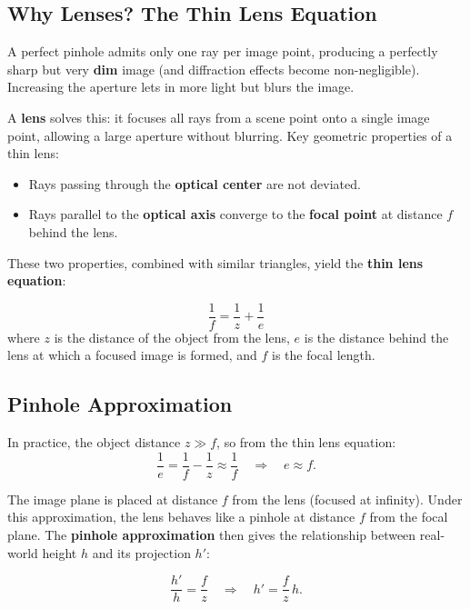\documentclass[11pt,a4paper]{article}
\theoremstyle{definition}
\theoremstyle{plain}
\theoremstyle{remark}
\begin{document}
\subsection{Why Lenses? The Thin Lens Equation}

A perfect pinhole admits only one ray per image point, producing a perfectly sharp but very \textbf{dim} image (and diffraction effects become non-negligible). Increasing the aperture lets in more light but blurs the image.

A \textbf{lens} solves this: it focuses all rays from a scene point onto a single image point, allowing a large aperture without blurring. Key geometric properties of a thin lens:

\begin{itemize}
    \item Rays passing through the \textbf{optical center} are not deviated.
    \item Rays parallel to the \textbf{optical axis} converge to the \textbf{focal point} at distance $f$ behind the lens.
\end{itemize}

These two properties, combined with similar triangles, yield the \textbf{thin lens equation}:

\begin{tcolorbox}[colback=blue!5!white,colframe=blue!75!black,title=\textbf{Thin Lens Equation}]
\[
\frac{1}{f} = \frac{1}{z} + \frac{1}{e}
\]
where $z$ is the distance of the object from the lens, $e$ is the distance behind the lens at which a focused image is formed, and $f$ is the focal length.
\end{tcolorbox}

\subsection{Pinhole Approximation}

In practice, the object distance $z \gg f$, so from the thin lens equation:
\[
\frac{1}{e} = \frac{1}{f} - \frac{1}{z} \approx \frac{1}{f} \quad \Longrightarrow \quad e \approx f.
\]

The image plane is placed at distance $f$ from the lens (focused at infinity). Under this approximation, the lens behaves like a pinhole at distance $f$ from the focal plane. The \textbf{pinhole approximation} then gives the relationship between real-world height $h$ and its projection $h'$:

\[
\frac{h'}{h} = \frac{f}{z} \quad \Longrightarrow \quad h' = \frac{f}{z}\,h.
\]
\end{document}
